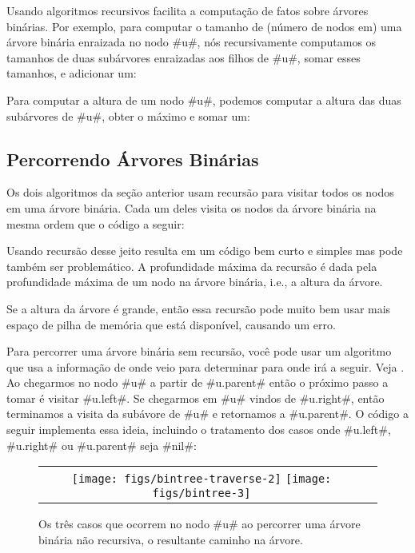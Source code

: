 %
Usando algoritmos recursivos facilita a computação de fatos sobre árvores 
binárias. Por exemplo, para computar o tamanho de (número de nodos em)
uma árvore binária enraizada no nodo #u#, nós recursivamente computamos
os tamanhos de duas subárvores enraizadas aos filhos de #u#, somar esses tamanhos, e adicionar um:


Para computar a altura de um nodo 
#u#, podemos computar a altura das duas subárvores de #u#, obter o máximo e somar um:


\subsection{Percorrendo Árvores Binárias}

%
%
%
Os dois algoritmos da seção anterior usam recursão para visitar
todos os nodos em uma árvore binária. Cada um deles visita os nodos
da árvore binária na mesma ordem que o código a seguir:

Usando recursão desse jeito resulta em um código bem curto e simples mas
pode também ser problemático. A profundidade máxima da recursão é dada
pela profundidade máxima de um nodo na árvore binária, i.e., a altura
da árvore.

Se a altura da árvore é grande, então essa recursão pode muito bem usar 
mais espaço de pilha de memória que está disponível, causando um erro.

Para percorrer uma árvore binária sem recursão, você pode usar um algoritmo 
que usa a informação de onde veio para determinar para onde irá a seguir.
Veja .  
Ao chegarmos no nodo #u# a partir de #u.parent# então o próximo passo
a tomar é visitar #u.left#. Se chegarmos em #u# vindos de #u.right#, então
terminamos a visita da subávore de #u# e retornamos a #u.parent#.
O código a seguir implementa essa ideia, incluindo o tratamento dos
casos onde #u.left#, #u.right# ou #u.parent# seja #nil#:

\begin{figure}
  \begin{center}
    \begin{tabular}{cc}
      \texttt{[image: figs/bintree-traverse-2]}
      \texttt{[image: figs/bintree-3]}
    \end{tabular}
  \end{center}
  \caption[Percorrendo uma BinaryTree]{Os três casos que ocorrem no nodo #u# ao percorrer uma árvore binária não recursiva, o resultante caminho na árvore.}
\end{figure}

